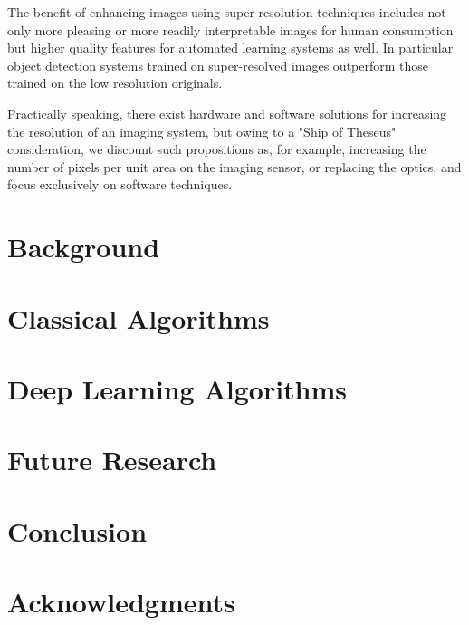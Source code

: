 \documentclass[journal]{IEEEtran}
\begin{document}
    The benefit of enhancing images using super resolution techniques includes not only more pleasing or more readily interpretable images
    for human consumption but higher quality features for automated learning systems as well.
    In particular object detection systems trained on super-resolved images outperform those trained on the low
    resolution originals\cite{effectssuperres}. %


    Practically speaking, there exist hardware and software solutions for increasing the resolution of an imaging
    system, but owing to a "Ship of Theseus" consideration, we discount such propositions as, for example, increasing
    the number of pixels per unit area on the imaging sensor, or replacing the optics, and focus exclusively on software techniques.






    \section{Background}\label{sec:background}
    \section{Classical Algorithms}\label{sec:classical-algorithms}
    \section{Deep Learning Algorithms}\label{sec:deep-learning-algorithms}
    \section{Future Research}\label{sec:future-research}
    \section{Conclusion}\label{sec:conclusion}

    \section*{Acknowledgments}
    \newpage
    \printbibliography
\end{document}
